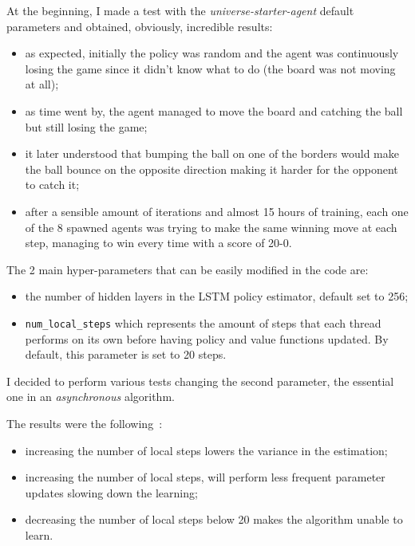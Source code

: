 At the beginning, I made  a test with the \textit{universe-starter-agent} default parameters and obtained, obviously, incredible results:
\begin{itemize}
    \item as expected, initially the policy was random and the agent was continuously losing the game since it didn't know what to do (the board was not moving at all);
    \item as time went by, the agent managed to move the board and catching the ball but still losing the game;
    \item it later understood that bumping the ball on one of the borders would make the ball bounce on the opposite direction making it harder for the opponent to catch it;
    \item after a sensible amount of iterations and almost 15 hours of training, each one of the 8 spawned agents was trying to make the same winning move at each step, managing to win every time with a score of 20-0.
\end{itemize}
\noindent
The 2 main hyper-parameters that can be easily modified in the code are:
\begin{itemize}
    \item the number of hidden layers in the LSTM policy estimator, default set to 256;
    \item \texttt{num\_local\_steps} which represents the amount of steps that each thread performs on its own before having policy and value functions updated. By default, this parameter is set to 20 steps.
\end{itemize}
\noindent
I decided to perform various tests changing the second parameter, the essential one in an \textit{asynchronous} algorithm.

The results were the following~\cite{universe-starter-agent}:
\begin{itemize}
    \item increasing the number of local steps lowers the variance in the estimation;
    \item increasing the number of local steps, will perform less frequent parameter updates slowing down the learning;
    \item decreasing the number of local steps below 20 makes the algorithm unable to learn.
\end{itemize}

